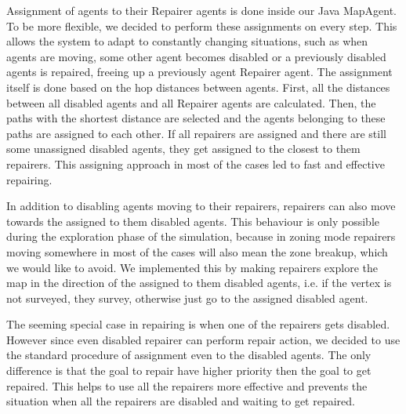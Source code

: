 Assignment of agents to their Repairer agents is done inside our Java MapAgent.
To be more flexible, we decided to perform these assignments on every step.
This allows the system to adapt to constantly changing situations, such as when agents are moving, some other agent becomes disabled or a previously disabled agents is repaired, freeing up a previously agent Repairer agent.
The assignment itself is done based on the hop distances between agents.
First, all the distances between all disabled agents and all Repairer agents are calculated.
Then, the paths with the shortest distance are selected and the agents belonging to these paths are assigned to each other.
If all repairers are assigned and there are still some unassigned disabled agents, they get assigned to the closest to them repairers. This assigning approach in most of the cases led to fast and effective repairing.

In addition to disabling agents moving to their repairers, repairers can also move towards the assigned to them disabled agents. This behaviour is only possible during the exploration phase of the simulation, because in zoning mode repairers moving somewhere in most of the cases will also mean the zone breakup, which we would like to avoid. We implemented this by making repairers explore the map in the direction of the assigned to them disabled agents, i.e. if the vertex is not surveyed, they survey, otherwise just go to the assigned disabled agent.

The seeming special case in repairing is when one of the repairers gets disabled. However since even disabled repairer can perform repair action, we decided to use the standard procedure of assignment even to the disabled agents. The only difference is that the goal to repair have higher priority then the goal to get repaired. This helps to use all the repairers more effective and prevents the situation when all the repairers are disabled and waiting to get repaired.

